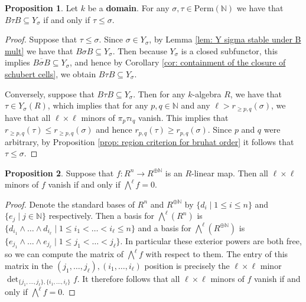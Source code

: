 \documentclass[oneside,11pt]{amsart}
\newcommand{\nn}{\ensuremath{\mathbb{N}}}
\newcommand{\Perm}{\ensuremath{\text{Perm}}}
\theoremstyle{definition}
\newtheorem{proof techniques}{Proof Techniques}
\newtheorem{proposition}{Proposition}
\begin{document}
\begin{proposition}\label{prop: closed version of a schubert cell contains closure of the schubert cell}
Let $k$ be a \textbf{domain}. For any $\sigma , \tau \in \Perm(\nn)$ we have that $B \tau B \subseteq Y_\sigma$ if and only if $\tau \leq \sigma$. 
\end{proposition}

\begin{proof}
Suppose that $\tau \leq \sigma$. Since $\sigma \in Y_\sigma$, by Lemma \ref{lem: Y sigma stable under B mult} we have that $B \sigma B \subseteq Y_\sigma$. Then because $Y_\sigma$ is a closed subfunctor, this implies $\overline{B \sigma B} \subseteq Y_\sigma$, and hence by Corollary \ref{cor: containment of the closure of schubert cells}, we obtain $B \tau B \subseteq Y_\sigma$.  

Conversely, suppose that $B \tau B \subseteq Y_\sigma$. Then for any $k$-algebra $R$, we have that $\tau \in Y_\sigma(R)$, which implies that for any $p, q \in \nn$ and any $\ell > r_{\geq p , q}(\sigma)$, we have that all $\ell \times \ell$ minors of $\pi_p  \tau  \iota_q$ vanish. This implies that $r_{\geq p , q}(\tau) \leq r_{\geq p , q}(\sigma)$ and hence $r_{p , q}(\tau) \geq r_{p , q}(\sigma)$. Since $p$ and $q$ were arbitrary, by Proposition \ref{prop: region criterion for bruhat order} it follows that $\tau \leq \sigma$. 
\end{proof}

\begin{proposition}\label{prop: minors vs wedge}
Suppose that $f : R^n \to R^{\oplus \nn}$ is an $R$-linear map. Then all $\ell \times \ell$ minors of $f$ vanish if and only if $\bigwedge^\ell f = 0$. 
\end{proposition}

\begin{proof}
Denote the standard bases of $R^n$ and $R^{\oplus \nn}$ by $\{ d_i \mid 1 \leq i \leq n \}$ and $\{ e_j \mid j \in \nn \}$ respectively. Then a basis for $\bigwedge^\ell(R^n)$ is $\{ d_{i_1} \wedge \ldots \wedge d_{i_\ell} \mid 1 \leq i_1 < \ldots < i_\ell \leq n \}$ and a basis for $\bigwedge^\ell(R^{\oplus \nn})$ is $\{ e_{j_1} \wedge \ldots \wedge e_{j_\ell} \mid 1 \leq j_1 < \ldots < j_\ell \}$. In particular these exterior powers are both free, so we can compute the matrix of $\bigwedge^\ell f$ with respect to them. The entry of this matrix in the $(j_1, \ldots, j_\ell)  , (i_1, \ldots, i_\ell)$ position is precisely the $\ell \times \ell$ minor $\det_{\{ j_1, \ldots, j_\ell \}, \{ i_1, \ldots, i_\ell \}} f$. It therefore follows that all $\ell \times \ell$ minors of $f$ vanish if and only if $\bigwedge^\ell f = 0$. 
\end{proof}
\end{document}
